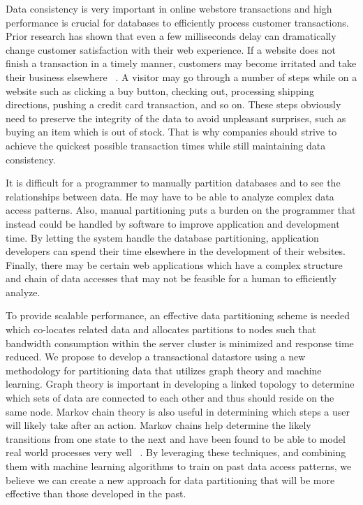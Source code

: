 \documentclass[10pt,final,journal]{IEEEtran}
\begin{document}
Data consistency is very important in online webstore transactions and high performance is crucial for databases to efficiently process customer transactions. Prior research has shown that even a few milliseconds delay can dramatically change customer satisfaction with their web experience. If a website does not finish a transaction in a timely manner, customers may become irritated and take their business elsewhere ~\cite{Ramsay:1998}. A visitor may go through a number of steps while on a website such as clicking a buy button, checking out, processing shipping directions, pushing a credit card transaction, and so on. These steps obviously need to preserve the integrity of the data to avoid unpleasant surprises, such as buying an item which is out of stock. That is why companies should strive to achieve the quickest possible transaction times while still maintaining data consistency.

It is difficult for a programmer to manually partition databases and to see the relationships between data. He may have to be able to analyze complex data access patterns. Also, manual partitioning puts a burden on the programmer that instead could be handled by software to improve application and development time. By letting the system handle the database partitioning, application developers can spend their time elsewhere in the development of their websites. Finally, there may be certain web applications which have a complex structure and chain of data accesses that may not be feasible for a human to efficiently analyze.

To provide scalable performance, an effective data partitioning scheme is needed which co-locates related data and allocates partitions to nodes such that bandwidth consumption within the server cluster is minimized and response time reduced. We propose to develop a  transactional datastore using a new methodology for partitioning data that utilizes graph theory and machine learning. Graph theory is important in developing a linked topology to determine which sets of data are connected to each other and thus should reside on the same node. Markov chain theory is also useful in determining which steps a user will likely take after an action. Markov chains help determine the likely transitions from one state to the next and have been found to be able to model real world processes very well ~\cite{Gilks:1996}. By leveraging these techniques, and combining them with machine learning algorithms to train on past data access patterns, we believe we can create a new approach for data partitioning that will be more effective than those developed in the past.
\end{document}
